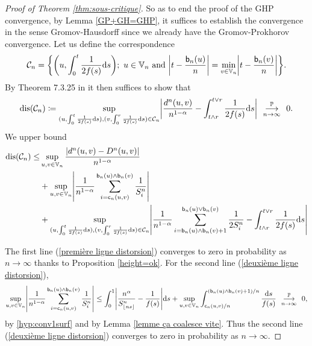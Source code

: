 \documentclass[11pt]{article}
\theoremstyle{plain}
\theoremstyle{definition}
\theoremstyle{remark}
\renewcommand{\P}{{\mathbb{P}}} %
\newcommand{\1}{\mathbbm{1}} %
\newcommand{\proba}[1]{\mathbb{P}\left(#1\right)} %
\newcommand{\birth}{\mathsf{b}} %
\newcommand{\coal}{\mathsf{c}} %
\newcommand{\V}{\mathbb{V}} %
\newcommand{\dc}{D} %
\newcommand{\cvproba}[1][n]{\enskip\mathop{\longrightarrow}^{\P}_{#1 \to \infty}\enskip}
\let\originalleft\left
\let\originalright\right
\renewcommand{\left}{\mathopen{}\mathclose\bgroup\originalleft}
\renewcommand{\right}{\aftergroup\egroup\originalright}
\begin{document}
\begin{proof}[Proof of Theorem \ref{thm:sous-critique}]
So as to end the proof of the GHP convergence, by {Lemma \ref{GP+GH=GHP}}, it suffices to establish the convergence in the sense Gromov-Hausdorff since we already have the Gromov-Prokhorov convergence. Let us define the correspondence
\[
\mathcal{C}_n=\left\{\left(u, \int_0^t \frac{1}{2f(s)} \mathrm{d}s\right); \ u \in \V_n \text{ and }\left|t-\frac{\birth_n(u)}{n}\right| = \min_{v\in \V_n} \left|t-\frac{\birth_n(v)}{n}\right|\right\}.
\]
By Theorem 7.3.25 in \cite{BBI01} it then suffices to show that
\begin{equation}\label{cv distorsion}
\mathrm{dis} (\mathcal{C}_n) \coloneqq \sup_{(u, \int_0^t \frac{1}{2f(s)} \mathrm{d}s), (v, \int_0^r \frac{1}{2f(s)} \mathrm{d}s) \in \mathcal{C}_n}
\left|
\frac{d^n(u,v)}{n^{1-\alpha}} - \int_{t\wedge r}^{t\vee r}\frac{1}{2f(s)} \mathrm{d}s
\right|
\cvproba[n] 0.
\end{equation}
We upper bound
\begin{align}
\mathrm{dis}(\mathcal{C}_n)
\le &\sup_{u, v \in \V_n}\frac{ |d^n(u,v)-\dc^n(u,v)|}{n^{1-\alpha}} \label{première ligne distorsion} \\
&+ \sup_{u,v \in \V_n}\left|
\frac{1}{n^{1-\alpha}} \sum_{i=\coal_n(u,v)}^{\birth_n(u)\wedge \birth_n(v)} \frac{1}{S_i^n}
\right| \label{deuxième ligne distorsion}\\
&+\sup_{(u, \int_0^t \frac{1}{2f(s)} \mathrm{d}s), (v, \int_0^r \frac{1}{2f(s)} \mathrm{d}s) \in \mathcal{C}_n}
\left|
\frac{1}{n^{1-\alpha}}
\sum_{i=\birth_n(u)\wedge \birth_n(v) +1}^{\birth_n(u) \vee \birth_n (v)} \frac{1}{2S^n_i} - \int_{t\wedge r}^{t\vee r} \frac{1}{2f(s)} \mathrm{d}s
\right| \label{troisième ligne distorsion}
\end{align}

The first line (\ref{première ligne distorsion}) converges to zero in probability as $n\to \infty$ thanks to Proposition \ref{height=ok}. For the second line (\ref{deuxième ligne distorsion}),
\[
\sup_{u,v \in \V_n}\left|
\frac{1}{n^{1-\alpha}} \sum_{i=\coal_n(u,v)}^{\birth_n(u)\wedge \birth_n(v)} \frac{1}{S_i^n}
\right| 
\le 
\int_0^1 \left\vert
\frac{n^\alpha }{S^n_{\lfloor ns \rfloor}} -\frac{1}{f(s)} 
\right\vert
\mathrm{d} s
+
\sup_{u, v \in \V_n} \int_{\coal_n(u,v)/n}^{(\birth_n(u)\wedge \birth_n(v)+1)/n} \frac{\mathrm{d}s}{f(s)}
\cvproba[n] 0
,
\]
by \ref{hyp:conv1surf} and by Lemma \ref{lemme ça coalesce vite}. Thus the second line (\ref{deuxième ligne distorsion}) converges to zero in probability as $n\to \infty$. 


\end{proof}
\end{document}
